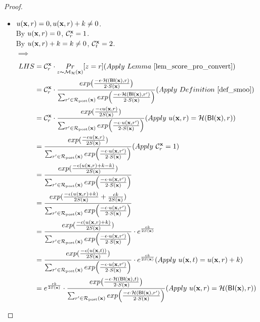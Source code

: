 \documentclass{article}
\begin{document}
\begin{proof}
\begin{itemize}
\begin{itemize}
  \end{itemize}

  \item {\boldmath$u(\textbf{x}, {r}) = 0, u(\textbf{x}, {r}) + k \neq 0$}. \\
        By $u(\textbf{x}, {r}) = 0$, $\mathcal{C}^{\textbf{x}}_{r} = 1$. \\
        By $u(\textbf{x}, {r}) + k = k \neq 0$, $\mathcal{C}^{\textbf{x}}_{t} = 2$. \\
        $\implies$\\
        \begin{equation*}
        \begin{split}
        LHS 
        & = \cardinality{\dataobs}{r} \cdot \hexpmechPr{\dataobs}{z = r}     (Apply\ Lemma\ \ref{lem_score_pro_convert})\\
        & = \cardinality{\dataobs}{r} \cdot \frac {exp\big(\frac{-\epsilon\cdot\hellinger(\bysinfer(\dataobs),r)}{2\cdot S(\dataobs)}\big)}{\nomalizer{\dataobs}} 
        (Apply\ Definition\ \ref{def_smoo})\\
        & = \cardinality{\dataobs}{r} \cdot \frac{exp(\frac{-\epsilon \ux{r}}{2 S(\dataobs)})}{\unomalizer{\dataobs}}
        (Apply\ \ux{r} = \hellinger(\bysinfer(\dataobs), r))\\
        & = \frac{exp(\frac{- \epsilon \ux{r}}{2 S(\dataobs)})}{\unomalizer{\dataobs}}                        (Apply \ \cardinality{\dataobs}{r} = 1) \\
        & = \frac{exp(\frac{- \epsilon (\ux{r} + k - k)}{2 S(\dataobs)})}{\unomalizer{\dataobs}}\\
        & = \frac{exp(\frac{- \epsilon (\ux{r} + k)}{2 S(\dataobs)} + \frac{\epsilon k}{2 S(\dataobs)})}{\unomalizer{\dataobs}}\\
        & = \frac{exp(\frac{-\epsilon (\ux{r} + k)}{2 S(\dataobs)})}{\unomalizer{\dataobs}} \cdot e^{\frac{\epsilon k}{2 S(\dataobs)}}\\
        & = \frac{exp(\frac{-\epsilon (\ux{t})}{2 S(\dataobs)})}{\unomalizer{\dataobs}} \cdot e^{\frac{\epsilon k}{2 S(\dataobs)}}  (Apply \ \ux{t} = \ux{r} + k)\\
        & = e^{\frac{\epsilon k}{2 S(\dataobs)}} \cdot \frac {exp\big(\frac{-\epsilon\cdot\hellinger(\bysinfer(\dataobs), t)}{2\cdot S(\dataobs)}\big)}{\nomalizer{\dataobs}} 
        (Apply\ \ux{r} = \hellinger(\bysinfer(\dataobs), r))\\

\end{split}
\end{equation*}
\end{itemize}
\end{proof}
\end{document}
